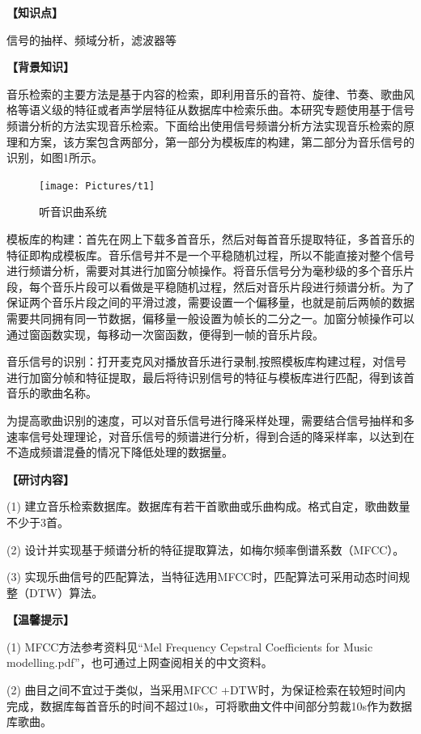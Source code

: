 \documentclass[11pt,a4paper,UTF8]{ctexart}
\begin{document}
	
	\textbf{【知识点】}
	
	信号的抽样、频域分析，滤波器等

	
	\textbf{【背景知识】}

	音乐检索的主要方法是基于内容的检索，即利用音乐的音符、旋律、节奏、歌曲风格等语义级的特征或者声学层特征从数据库中检索乐曲。本研究专题使用基于信号频谱分析的方法实现音乐检索。下面给出使用信号频谱分析方法实现音乐检索的原理和方案，该方案包含两部分，第一部分为模板库的构建，第二部分为音乐信号的识别，如图1所示。

	
	\begin{figure}
		\centering
		\texttt{[image: Pictures/t1]}
		\caption{听音识曲系统}
		\label{fig:t1}
	\end{figure}
	

	模板库的构建：首先在网上下载多首音乐，然后对每首音乐提取特征，多首音乐的特征即构成模板库。音乐信号并不是一个平稳随机过程，所以不能直接对整个信号进行频谱分析，需要对其进行加窗分帧操作。将音乐信号分为毫秒级的多个音乐片段，每个音乐片段可以看做是平稳随机过程，然后对音乐片段进行频谱分析。为了保证两个音乐片段之间的平滑过渡，需要设置一个偏移量，也就是前后两帧的数据需要共同拥有同一节数据，偏移量一般设置为帧长的二分之一。加窗分帧操作可以通过窗函数实现，每移动一次窗函数，便得到一帧的音乐片段。

	音乐信号的识别：打开麦克风对播放音乐进行录制,按照模板库构建过程，对信号进行加窗分帧和特征提取，最后将待识别信号的特征与模板库进行匹配，得到该首音乐的歌曲名称。

	为提高歌曲识别的速度，可以对音乐信号进行降采样处理，需要结合信号抽样和多速率信号处理理论，对音乐信号的频谱进行分析，得到合适的降采样率，以达到在不造成频谱混叠的情况下降低处理的数据量。

	
	\textbf{【研讨内容】}

	(1) 建立音乐检索数据库。数据库有若干首歌曲或乐曲构成。格式自定，歌曲数量不少于3首。

	(2) 设计并实现基于频谱分析的特征提取算法，如梅尔频率倒谱系数（MFCC）。

	(3) 实现乐曲信号的匹配算法，当特征选用MFCC时，匹配算法可采用动态时间规整（DTW）算法。

	\textbf{【温馨提示】}

	(1) MFCC方法参考资料见“Mel Frequency Cepstral Coefficients for Music modelling.pdf”，也可通过上网查阅相关的中文资料。

	(2) 曲目之间不宜过于类似，当采用MFCC +DTW时，为保证检索在较短时间内完成，数据库每首音乐的时间不超过10s，可将歌曲文件中间部分剪裁10s作为数据库歌曲。
\end{document}
